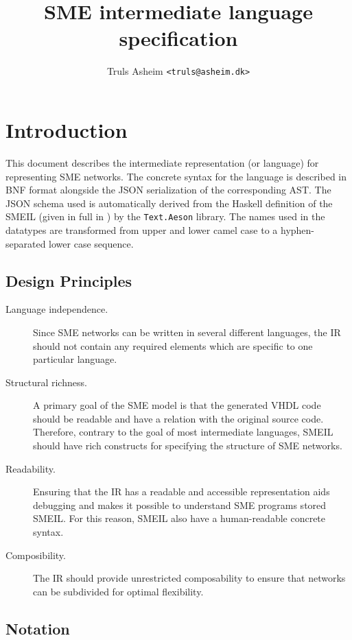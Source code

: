 \documentclass{article}
\title{SME intermediate language specification}
\author{Truls Asheim {\tt <truls@asheim.dk>}}
\date{}
\begin{document}
\maketitle

\section{Introduction}
This document describes the intermediate representation (or language) for
representing SME networks. The concrete syntax for the language is described in
BNF format alongside the JSON serialization of the corresponding AST. The JSON
schema used is automatically derived from the Haskell definition of the SMEIL
(given in full in ) by the \texttt{Text.Aeson} library. The names
used in the datatypes are transformed from upper and lower camel case to
a hyphen-separated lower case sequence.

\subsection{Design Principles}
\begin{description}
\item[Language independence.] Since SME networks can be written in several
  different languages, the IR should not contain any required elements which are
  specific to one particular language.
\item[Structural richness.] A primary goal of the SME model is that the
  generated VHDL code should be readable and have a relation with the original
  source code. Therefore, contrary to the goal of most intermediate languages,
  SMEIL should have rich constructs for specifying the structure of SME
  networks.
\item[Readability.] Ensuring that the IR has a readable and accessible
  representation aids debugging and makes it possible to understand SME programs
  stored SMEIL. For this reason, SMEIL also have a human-readable concrete
  syntax.
\item[Composibility.] The IR should provide unrestricted composability to ensure
  that networks can be subdivided for optimal flexibility.
\end{description}

\subsection{Notation}
\end{document}
